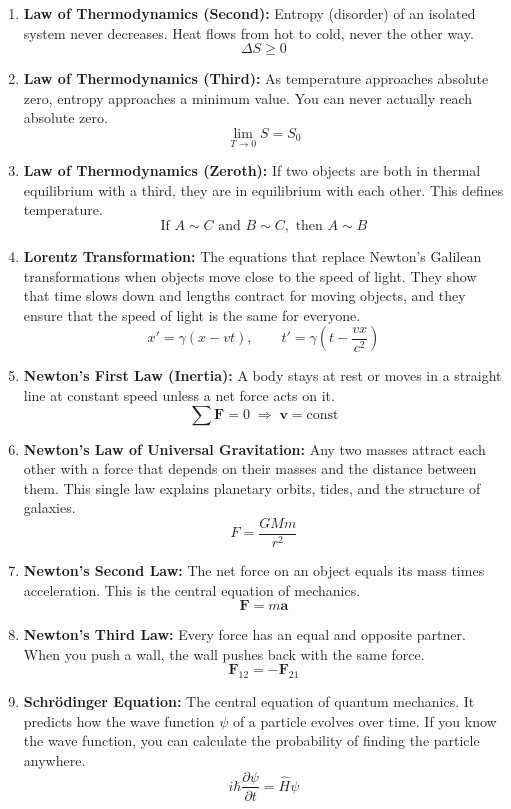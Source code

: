 \begin{enumerate}
\item \textbf{Law of Thermodynamics (Second):} Entropy (disorder) of an isolated system never decreases. Heat flows from hot to cold, never the other way.
\[
\Delta S\geq 0
\]

\item \textbf{Law of Thermodynamics (Third):} As temperature approaches absolute zero, entropy approaches a minimum value. You can never actually reach absolute zero.
\[
\lim_{T\to 0}S=S_0
\]

\item \textbf{Law of Thermodynamics (Zeroth):} If two objects are both in thermal equilibrium with a third, they are in equilibrium with each other. This defines temperature.
\[
\text{If }A\sim C\text{ and }B\sim C,\text{ then }A\sim B
\]

\item \textbf{Lorentz Transformation:} The equations that replace Newton's Galilean transformations when objects move close to the speed of light. They show that time slows down and lengths contract for moving objects, and they ensure that the speed of light is the same for everyone.
\[
x'=\gamma(x-vt),\qquad
t'=\gamma\left(t-\frac{vx}{c^2}\right)
\]

\item \textbf{Newton's First Law (Inertia):} A body stays at rest or moves in a straight line at constant speed unless a net force acts on it.
\[
\sum\mathbf F=0 \;\Rightarrow\; \mathbf v=\text{const}
\]

\item \textbf{Newton's Law of Universal Gravitation:} Any two masses attract each other with a force that depends on their masses and the distance between them. This single law explains planetary orbits, tides, and the structure of galaxies.
\[
F=\frac{GMm}{r^2}
\]

\item \textbf{Newton's Second Law:} The net force on an object equals its mass times acceleration. This is the central equation of mechanics.
\[
\mathbf F=m\mathbf a
\]

\item \textbf{Newton's Third Law:} Every force has an equal and opposite partner. When you push a wall, the wall pushes back with the same force.
\[
\mathbf F_{12}=-\mathbf F_{21}
\]

\item \textbf{Schr\"odinger Equation:} The central equation of quantum mechanics. It predicts how the wave function $\psi$ of a particle evolves over time. If you know the wave function, you can calculate the probability of finding the particle anywhere.
\[
i\hbar\frac{\partial\psi}{\partial t}=\hat H\psi
\]

\end{enumerate}
